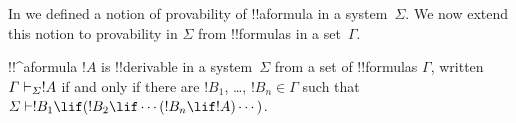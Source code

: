 \documentclass[../../../include/open-logic-section]{subfiles}
\begin{document}


In  we defined a notion of provability
of !!a{formula} in a system~$\Sigma$. We now extend this notion to
provability in $\Sigma$ from !!{formula}s in a set~$\Gamma$.

\begin{defn}
  !!^a{formula} $!A$ is !!{derivable} in a system~$\Sigma$ from a set of
  !!{formula}s $\Gamma$, written $\Gamma \Proves[\Sigma] !A$ if and
  only if there are $!B_1$, \dots, $!B_n \in \Gamma$ such that
  $\Sigma \Proves !B_1 \lif (!B_2 \lif \cdots (!B_n \lif !A)
  \cdots)$. 
\end{defn}
\end{document}
